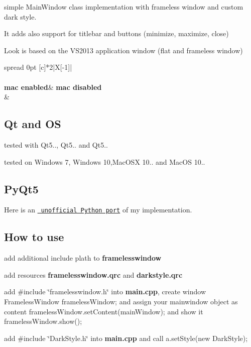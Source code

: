 simple Main\+Window class implementation with frameless window and custom dark style.

It adds also support for titlebar and buttons (minimize, maximize, close)

Look is based on the V\+S2013 application window (flat and frameless window)

\tabulinesep=1mm
\begin{longtabu}spread 0pt [c]{*{2}{|X[-1]}|}
\hline
{}\\
\endfirsthead
\hline
\endfoot
\hline
{}\\
\endhead
\cellcolor{\tableheadbgcolor}\textbf{ mac enabled}&\cellcolor{\tableheadbgcolor}\textbf{ mac disabled }\\
 &  \\
\end{longtabu}


\subsection*{Qt and OS}


\begin{DoxyItemize}
\item tested with Qt5.., Qt5.. and Qt5..
\item tested on Windows 7, Windows 10,Mac\+O\+SX 10.. and Mac\+OS 10..
\end{DoxyItemize}

\subsection*{Py\+Qt5}

Here is an \href{https://github.com/gmarull/qtmodern}{\texttt{ unofficial Python port}} of my implementation.

\subsection*{How to use}


\begin{DoxyItemize}
\item add additional include plath to {\bfseries{framelesswindow}}
\item add resources {\bfseries{framelesswindow.\+qrc}} and {\bfseries{darkstyle.\+qrc}}
\item add {\ttfamily \#include \char`\"{}framelesswindow.\+h\char`\"{}} into {\bfseries{main.\+cpp}}, create window {\ttfamily Frameless\+Window frameless\+Window;} and assign your mainwindow object as content {\ttfamily frameless\+Window.\+set\+Content(main\+Window);} and show it {\ttfamily frameless\+Window.\+show();}
\item add {\ttfamily \#include \char`\"{}\+Dark\+Style.\+h\char`\"{}} into {\bfseries{main.\+cpp}} and call {\ttfamily a.\+set\+Style(new Dark\+Style);}
\end{DoxyItemize}


